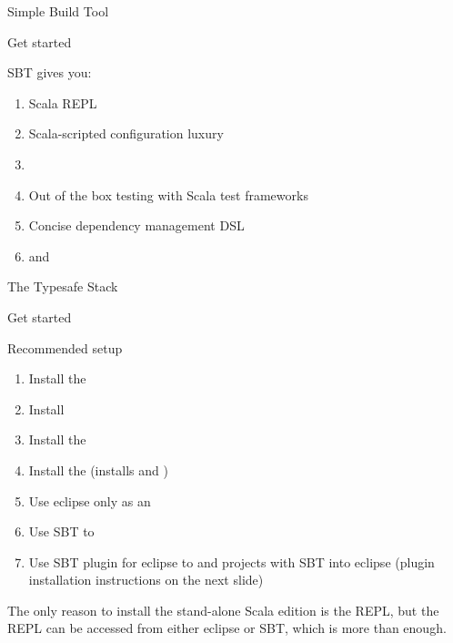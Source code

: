 \begin{frame}{Simple Build Tool}
\begin{center}
\end{center}
\begin{center}
Get started
\end{center}
SBT gives you:
\begin{enumerate}
  \item Scala REPL
  \item Scala-scripted configuration luxury
  \item {}
  \item Out of the box testing with Scala test frameworks
  \item Concise dependency management DSL
  \item and 
\end{enumerate}
\end{frame}

\begin{frame}{The Typesafe Stack}
\begin{center}
\end{center}
\begin{center}
Get started 
\end{center}
\end{frame}

\begin{frame}{Recommended setup}
\begin{enumerate}
  \item Install the 
  \item Install 
  \item Install the 
  \item Install the  (installs  and
  )
  \item Use eclipse only as an 
  \item Use SBT to 
  \item Use SBT plugin for eclipse to  and 
  projects with SBT into eclipse (plugin installation instructions on the next
  slide)
\end{enumerate}
The only reason to install the stand-alone Scala edition is the REPL, but the
REPL can be accessed from either eclipse or SBT, which is more than enough.
\end{frame}

